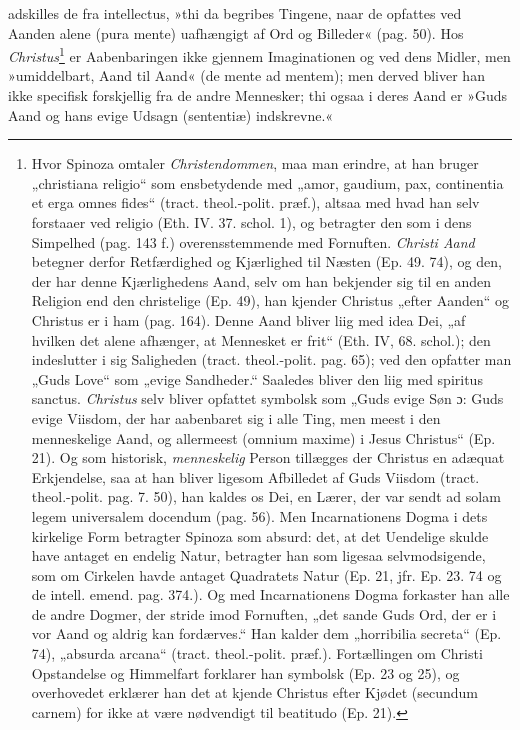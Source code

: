 \documentclass[12pt,a4paper]{book}
\newcommand{\opage}[1]{\marginnote{\footnotesize\textit{[#1]}}}
\begin{document}
adskilles de fra intellectus, »thi da begribes Tingene, naar de opfattes ved Aanden alene (pura mente) uafhængigt af Ord og Billeder« (pag. 50). Hos \emph{Christus}\footnote{Hvor Spinoza omtaler \emph{Christendommen}, maa man erindre, at han bruger „christiana religio“ som ensbetydende med „amor, gaudium, pax, continentia et erga omnes fides“ (tract. theol.-polit. præf.), altsaa med hvad han selv forstaaer ved religio (Eth. IV. 37. schol. 1), og betragter den som i dens Simpelhed (pag. 143 f.) overensstemmende med Fornuften. \emph{Christi Aand} betegner derfor Retfærdighed og Kjærlighed til Næsten (Ep. 49. 74), og den, der har denne Kjærlighedens Aand, selv om han bekjender sig til en anden Religion end den christelige (Ep. 49), han kjender Christus „efter Aanden“ og Christus er i ham (pag. 164). Denne Aand bliver liig med idea Dei, „af hvilken det alene afhænger, at Mennesket er frit“ (Eth. IV, 68. schol.); den indeslutter i sig Saligheden (tract. theol.-polit. pag. 65); ved den opfatter man „Guds Love“ som „evige Sandheder.“ Saaledes bliver den liig med spiritus sanctus. \emph{Christus} selv bliver opfattet symbolsk som „Guds evige Søn ɔ: Guds evige Viisdom, der har aabenbaret sig i alle Ting, men meest i den menneskelige Aand, og allermeest (omnium maxime) i Jesus Christus“ (Ep. 21). Og som historisk, \emph{menneskelig} Person tillægges der Christus en adæquat Erkjendelse, saa at han bliver ligesom Afbilledet af Guds Viisdom (tract. theol.-polit. pag. 7. 50), han kaldes os Dei, en Lærer, der var sendt ad solam legem universalem docendum (pag. 56). Men Incarnationens Dogma i dets kirkelige Form betragter Spinoza som absurd: det, at det Uendelige skulde have antaget en endelig Natur, betragter han som ligesaa selvmodsigende, som om Cirkelen havde antaget Quadratets Natur (Ep. 21, jfr. Ep. 23. 74 og de intell. emend. pag. 374.). Og med Incarnationens Dogma forkaster han alle de andre Dogmer, der stride imod Fornuften, „det sande Guds Ord, der er i vor Aand og aldrig kan fordærves.“ Han kalder dem „horribilia secreta“ (Ep. 74), „absurda arcana“ (tract. theol.-polit. præf.). Fortællingen om Christi Opstandelse og Himmelfart forklarer han symbolsk (Ep. 23 og 25), og overhovedet erklærer han det at kjende Christus efter Kjødet (secundum carnem) for ikke at være nødvendigt til beatitudo (Ep. 21).} er Aabenbaringen ikke gjennem Imaginationen og ved dens Midler, men »umiddelbart, Aand til Aand« (de mente ad mentem); men derved bliver han ikke specifisk forskjellig fra de andre
\opage{151} %
\setcounter{footnote}{0}%
Mennesker; thi ogsaa i deres Aand er »Guds Aand og hans evige Udsagn (sententiæ) indskrevne.«
\end{document}

